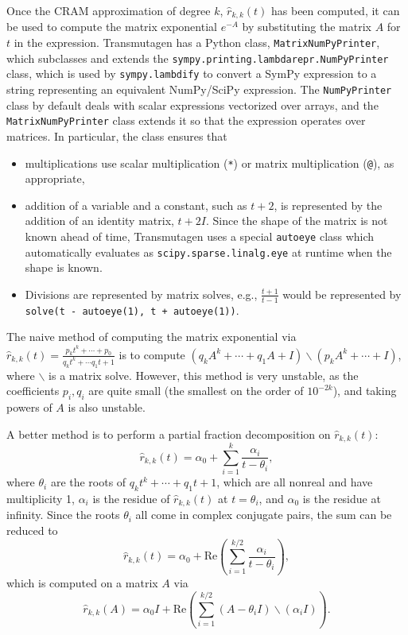 Once the CRAM approximation of degree $k$, $\hat{r}_{k, k}(t)$ has been
computed, it can be used to compute the matrix exponential $e^{-A}$ by
substituting the matrix $A$ for $t$ in the expression. Transmutagen has a
Python class, \texttt{MatrixNumPyPrinter}, which subclasses and extends the
\texttt{sympy.printing.lambdarepr.NumPyPrinter} class, which is used by
\texttt{sympy.lambdify} to convert a SymPy expression to a string representing
an equivalent NumPy/SciPy expression. The \texttt{NumPyPrinter} class by
default deals with scalar expressions vectorized over arrays, and the
\texttt{MatrixNumPyPrinter} class extends it so that the expression operates
over matrices. In particular, the class ensures that

\begin{itemize}
\item multiplications use scalar multiplication (\texttt{*}) or
  matrix multiplication (\texttt{@}), as appropriate,
\item addition of a variable and a constant, such as $t + 2$, is represented
  by the addition of an identity matrix, $t + 2I$. Since the shape of the
  matrix is not known ahead of time, Transmutagen uses a special
  \texttt{autoeye} class which automatically evaluates as \texttt{scipy.sparse.linalg.eye} at runtime when the shape is known.
\item Divisions are represented by matrix solves, e.g., $\frac{t + 1}{t - 1}$
  would be represented by \texttt{solve(t - autoeye(1), t + autoeye(1))}.
\end{itemize}

The naive method of computing the matrix exponential via $\hat{r}_{k,
  k}(t)=\frac{p_kt^k + \cdots + p_0}{q_kt^k + \cdots q_1t + 1}$
is to compute $(q_kA^k + \cdots + q_1A + I)\backslash(p_kA^k + \cdots + I)$, where
$\backslash$ is a matrix solve. However, this method is very unstable, as the
coefficients $p_i,q_i$ are quite small (the smallest on the order of
$10^{-2k}$), and taking powers of $A$ is also unstable.

A better method is to perform a partial fraction decomposition on $\hat{r}_{k,
  k}(t)$:
\begin{equation}
  \hat{r}_{k, k}(t) = \alpha_0 + \sum_{i=1}^k \frac{\alpha_i}{t - \theta_i},
\end{equation}
where $\theta_i$ are the roots of $q_kt^k + \cdots + q_1t + 1$, which are all
nonreal and have multiplicity 1, $\alpha_i$ is the residue of $\hat{r}_{k,
  k}(t)$ at $t=\theta_i$, and $\alpha_0$ is the residue at infinity. Since the
roots $\theta_i$ all come in complex conjugate pairs, the sum can be reduced to
\begin{equation}
  \hat{r}_{k, k}(t) = \alpha_0 + \mathrm{Re}\left(\sum_{i=1}^{k/2} \frac{\alpha_i}{t - \theta_i}\right),
\end{equation}
which is computed on a matrix $A$ via
\begin{equation}
  \hat{r}_{k, k}(A) = \alpha_0I + \mathrm{Re}\left(\sum_{i=1}^{k/2} (A -
    \theta_i I)\backslash(\alpha_i I) \right).
\end{equation}

